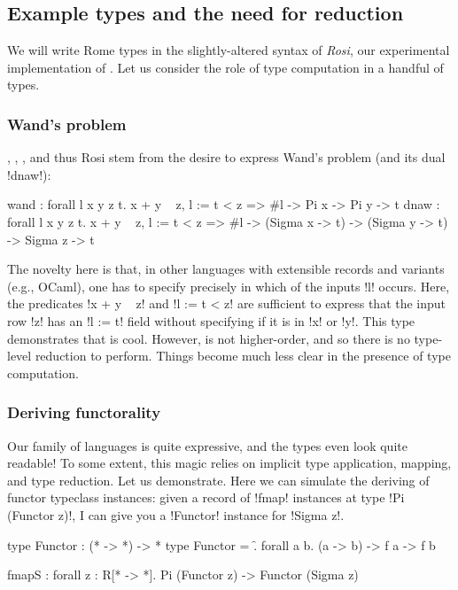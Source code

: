 \documentclass[authoryear, acmsmall, screen, review, nonacm]{acmart} %
\begin{document}
\InlineOn{}
\subsection{Example types and the need for reduction}
We will write Rome types in the slightly-altered syntax of \emph{Rosi}, our experimental implementation of \Rome. Let us consider the role of type computation in a handful of \Rome types. 


\subsubsection{Wand's problem} \Rome, \RO, \Rose, and thus Rosi stem from the desire to express Wand's problem (and its dual !dnaw!):

\begin{rosi}
wand : forall l x y z t. x + y ~ z, {l := t} < z => #l -> Pi x -> Pi y -> t
dnaw : forall l x y z t. x + y ~ z, {l := t} < z => #l -> 
      (Sigma x -> t) -> (Sigma y -> t) -> Sigma z -> t
\end{rosi}

\Ni The novelty here is that, in other languages with extensible records and variants (e.g., OCaml), one has to specify precisely in which of the inputs !l! occurs. Here, the predicates !x + y ~ z! and !{l := t} < z! are sufficient to express that the input row !z! has an !{l := t}! field without specifying if it is in !x! or !y!. This type demonstrates that \Rose is cool. However, \Rose is not higher-order, and so there is no type-level reduction to perform. Things become much less clear in the presence of type computation.


\InlineOff{}
\subsubsection{Deriving functorality} Our family of languages is quite expressive, and the types even look quite readable! To some extent, this magic relies on implicit type application, mapping, and type reduction. Let us demonstrate. \InlineOn{} Here we can simulate the deriving of functor typeclass instances: given a record of !fmap! instances at type !Pi (Functor z)!, I can give you a !Functor! instance for !Sigma z!. 

\begin{rosi}
type Functor : (* -> *) -> *
type Functor = \f. forall a b. (a -> b) -> f a -> f b

fmapS : forall z : R[* -> *]. Pi (Functor z) -> Functor (Sigma z)
\end{rosi}
\end{document}
